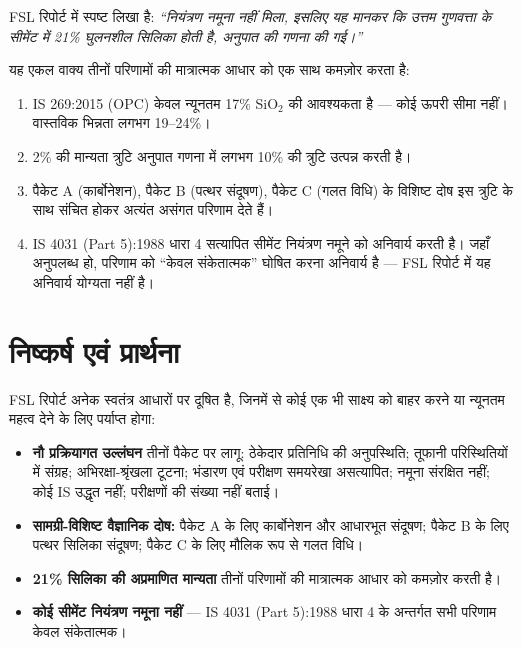 \documentclass[12pt, a4paper]{article}
\begin{document}
\begin{criticalbox}
FSL रिपोर्ट में स्पष्ट लिखा है: \textit{``नियंत्रण नमूना नहीं मिला, इसलिए यह मानकर कि उत्तम गुणवत्ता के सीमेंट में 21\% घुलनशील सिलिका होती है, अनुपात की गणना की गई।''}

यह एकल वाक्य तीनों परिणामों की मात्रात्मक आधार को एक साथ कमज़ोर करता है:
\begin{enumerate}
  \item IS 269:2015 (OPC) केवल न्यूनतम 17\% SiO$_2$ की आवश्यकता है --- कोई ऊपरी सीमा नहीं। वास्तविक भिन्नता लगभग 19--24\%।
  \item 2\% की मान्यता त्रुटि अनुपात गणना में लगभग 10\% की त्रुटि उत्पन्न करती है।
  \item पैकेट A (कार्बोनेशन), पैकेट B (पत्थर संदूषण), पैकेट C (गलत विधि) के विशिष्ट दोष इस त्रुटि के साथ संचित होकर अत्यंत असंगत परिणाम देते हैं।
  \item IS 4031 (Part 5):1988 धारा 4 सत्यापित सीमेंट नियंत्रण नमूने को अनिवार्य करती है। जहाँ अनुपलब्ध हो, परिणाम को ``केवल संकेतात्मक'' घोषित करना अनिवार्य है --- FSL रिपोर्ट में यह अनिवार्य योग्यता नहीं है।
\end{enumerate}
\end{criticalbox}

\section{निष्कर्ष एवं प्रार्थना}

FSL रिपोर्ट अनेक स्वतंत्र आधारों पर दूषित है, जिनमें से कोई एक भी साक्ष्य को बाहर करने या न्यूनतम महत्व देने के लिए पर्याप्त होगा:

\begin{itemize}
  \item \textbf{नौ प्रक्रियागत उल्लंघन} तीनों पैकेट पर लागू: ठेकेदार प्रतिनिधि की अनुपस्थिति; तूफानी परिस्थितियों में संग्रह; अभिरक्षा-श्रृंखला टूटना; भंडारण एवं परीक्षण समयरेखा असत्यापित; नमूना संरक्षित नहीं; कोई IS उद्धृत नहीं; परीक्षणों की संख्या नहीं बताई।
  \item \textbf{सामग्री-विशिष्ट वैज्ञानिक दोष:} पैकेट A के लिए कार्बोनेशन और आधारभूत संदूषण; पैकेट B के लिए पत्थर सिलिका संदूषण; पैकेट C के लिए मौलिक रूप से गलत विधि।
  \item \textbf{21\% सिलिका की अप्रमाणित मान्यता} तीनों परिणामों की मात्रात्मक आधार को कमज़ोर करती है।
  \item \textbf{कोई सीमेंट नियंत्रण नमूना नहीं} --- IS 4031 (Part 5):1988 धारा 4 के अन्तर्गत सभी परिणाम केवल संकेतात्मक।
\end{itemize}
\end{document}
